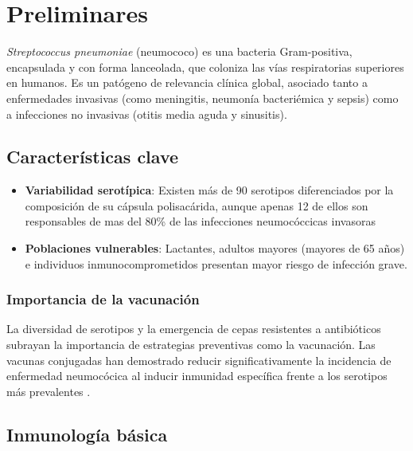 \chapter{Preliminares}\label{chapter:preliminares}


\textit{Streptococcus pneumoniae} (neumococo) es una bacteria Gram-positiva, encapsulada y con forma lanceolada, que coloniza las vías respiratorias superiores en humanos. Es un patógeno de relevancia clínica global, asociado tanto a enfermedades invasivas (como meningitis, neumonía bacteriémica y sepsis) como a infecciones no invasivas (otitis media aguda y sinusitis).



\section{Características clave}
\begin{itemize}
    \item \textbf{Variabilidad serotípica}: Existen más de 90 serotipos diferenciados por la composición de su cápsula polisacárida, aunque apenas 12 de ellos son responsables de mas del 80\% de las infecciones neumocóccicas invasoras\cite{PREADOJ2001}
    \item \textbf{Poblaciones vulnerables}: Lactantes, adultos mayores (mayores de 65 años) e individuos inmunocomprometidos presentan mayor riesgo de infección grave.
\end{itemize}

\subsection{Importancia de la vacunación}
La diversidad de serotipos y la emergencia de cepas resistentes a antibióticos subrayan la importancia de estrategias preventivas como la vacunación. Las vacunas conjugadas han demostrado reducir significativamente la incidencia de enfermedad neumocócica al inducir inmunidad específica frente a los serotipos más prevalentes \cite{Snedecor2020a,Snedecor2020b}.

\section{Inmunología básica}

